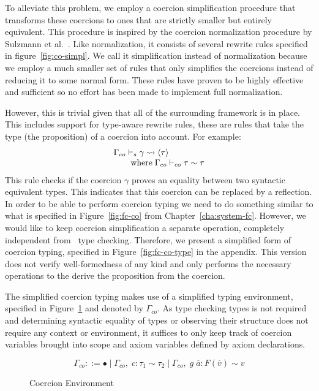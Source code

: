 To alleviate this problem, we employ a coercion simplification procedure that
transforms these coercions to ones that are strictly smaller but entirely
equivalent. This procedure is inspired by the coercion normalization procedure
by Sulzmann et al.~\cite{Sulzmann:2007:SFT:1190315.1190324}. Like
normalization, it consists of several rewrite rules specified in
figure~\ref{fig:co-simpl}. We call it simplification instead of normalization
because we employ a much smaller set of rules that only simplifies the coercions
instead of reducing it to some normal form. These rules have proven to be highly
effective and sufficient so no effort has been made to implement full
normalization.

However, this is trivial given that all of the surrounding framework is in
place. This includes support for type-aware rewrite rules, these are rules that
take the type (the proposition) of a coercion into account. For example:
\[
\begin{array}{l}
\Gamma_{co} \vdash_s \gamma \rightsquigarrow \langle \tau \rangle\\
\qquad \text{where} \; \Gamma_{co} \vdash_{co} \tau \sim \tau
\end{array}
\]
This rule checks if the coercion $\gamma$ proves an equality between two
syntactic equivalent types. This indicates that this coercion can be replaced by
a reflection. In order to be able to perform coercion typing we need to
do something similar to what is specified in Figure~\ref{fig:fc-co} from
Chapter~\ref{cha:system-fc}. However, we would like to keep coercion
simplification a separate operation, completely independent from \systemfc ~type
checking. Therefore, we present a simplified form of coercion typing, specified
in Figure~\ref{fig:fc-co-type} in the appendix. This version does not verify
well-formedness of any kind and only performs the necessary operations to the
derive the proposition from the coercion.

The simplified coercion typing makes use of a simplified typing environment,
specified in Figure~\ref{fig:co-env} and denoted by $\Gamma_{co}$. As type
checking types is not required and determining syntactic equality of types or
observing their structure does not require any context or environment, it
suffices to only keep track of coercion variables brought into scope and axiom
variables defined by axiom declarations.

\begin{figure}
\[
\Gamma_{co} ::= \bullet \mid \Gamma_{co}, \; c : \tau_1 \sim \tau_2 \mid
\Gamma_{co}, \; g \; \overline{a} : F(\overline{v}) \sim v
\]
\caption{Coercion Environment}
\label{fig:co-env}
\end{figure}
